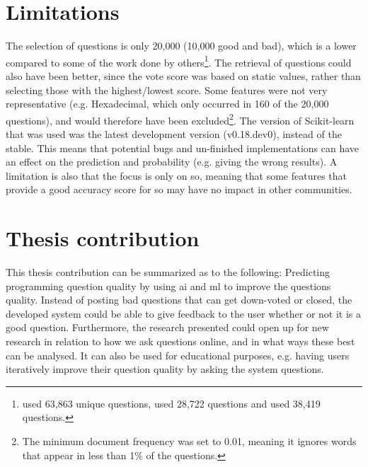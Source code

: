 \section{Limitations}
\label{sec:limitations}
The selection of questions is only 20,000 (10,000 good and bad), which is a lower compared to some of the work done by others\footnote{
	\textcite{Wang2013} used 63,863 unique questions, %
	\textcite{Anderson2012} used 28,722 questions %
	and \textcite{Treude2011} used 38,419 questions. %
}.
The retrieval of questions could also have been better, since the vote score was based on static values, rather than selecting those with the highest/lowest score.
Some features were not very representative (e.g. Hexadecimal, which only occurred in 160 of the 20,000 questions), and would therefore have been excluded\footnote{
	The minimum document frequency was set to 0.01, meaning it ignores words that appear in less than 1\% of the questions.
}.
The version of Scikit-learn that was used was the latest development version (v0.18.dev0), instead of the stable. 
This means that potential bugs and un-finished implementations can have an effect on the prediction and probability (e.g. giving the wrong results).
A limitation is also that the focus is only on \gls{so}, meaning that some features that provide a good accuracy score for \gls{so} may have no impact in other communities.
 
\section{Thesis contribution}
\label{sec:thesis_contribution}
This thesis contribution can be summarized as to the following: 
Predicting programming question quality by  using \gls{ai} and \gls{ml} to improve the questions quality. 
Instead of posting bad questions that can get down-voted or closed, the developed system could be able to give feedback to the user whether or not it is a good question.
Furthermore, the research presented could open up for new research in relation to how we ask questions online, and in what ways these best can be analysed.
It can also be used for educational purposes, e.g. having users iteratively improve their question quality by asking the system questions.

